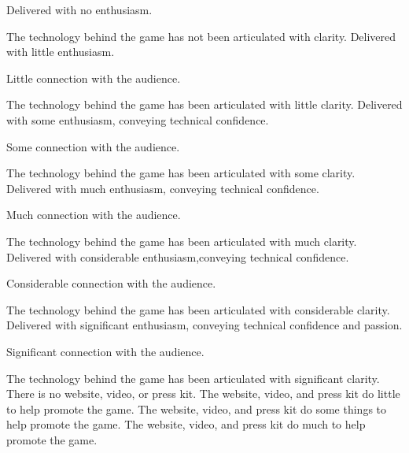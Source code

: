 \documentclass{../fal_assignment}
\begin{document}
\begin{markingrubric}
%
        \grade\fail Delivered with no enthusiasm. 
           \par The technology behind the game has not been articulated with clarity.
        \grade Delivered with little enthusiasm. 
            \par Little connection with the audience.
            \par The technology behind the game has been articulated with little clarity.
        \grade Delivered with some enthusiasm, conveying technical confidence. 
            \par Some connection with the audience.
            \par The technology behind the game has been articulated with some clarity.
        \grade Delivered with much enthusiasm, conveying technical confidence. 
            \par Much connection with the audience.
            \par The technology behind the game has been articulated with much clarity.
        \grade Delivered with considerable enthusiasm,conveying technical confidence. 
            \par Considerable connection with the audience.
            \par The technology behind the game has been articulated with considerable clarity.
        \grade Delivered with significant enthusiasm, conveying technical confidence and passion.
            \par Significant connection with the audience.
            \par The technology behind the game has been articulated with significant clarity.
%
        \grade\fail There is no website, video, or press kit. 
        \grade The website, video, and press kit do little to help promote the game.
        \grade The website, video, and press kit do some things to help promote the game.
        \grade The website, video, and press kit do much to help promote the game.

\end{markingrubric}
\end{document}
